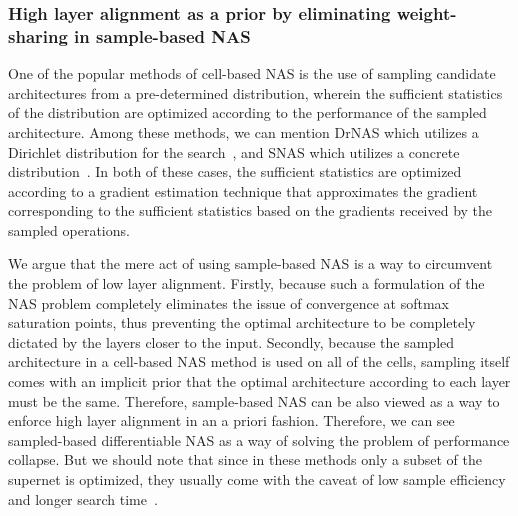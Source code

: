 \documentclass{article} \usepackage{fancyhdr, iclr2023_conference, times}
\newcommand{\lambdafn}{layer alignment\xspace}
\begin{document}
\subsubsection{High \lambdafn as a prior by eliminating weight-sharing in sample-based NAS}
\par One of the popular methods of cell-based NAS is the use of sampling candidate architectures from a pre-determined distribution, wherein the sufficient statistics of the distribution are optimized according to the performance of the sampled architecture. Among these methods, we can mention DrNAS which utilizes a Dirichlet distribution for the search~\citep{DBLP:conf/iclr/ChenWCTH21}, and SNAS which utilizes a concrete distribution~\citep{DBLP:conf/iclr/XieZLL19}. In both of these cases, the sufficient statistics are optimized according to a gradient estimation technique that approximates the gradient corresponding to the sufficient statistics based on the gradients received by the sampled operations.
\par We argue that the mere act of using sample-based NAS is a way to circumvent the problem of low \lambdafn. Firstly, because such a formulation of the NAS problem completely eliminates the issue of convergence at softmax saturation points, thus preventing the optimal architecture to be completely dictated by the layers closer to the input. Secondly, because the sampled architecture in a cell-based NAS method is used on all of the cells, sampling itself comes with an implicit prior that the optimal architecture according to each layer must be the same. Therefore, sample-based NAS can be also viewed as a way to enforce high \lambdafn in an a priori fashion. Therefore, we can see sampled-based differentiable NAS as a way of solving the problem of performance collapse. But we should note that since in these methods only a subset of the supernet is optimized, they usually come with the caveat of low sample efficiency and longer search time~\citep{DBLP:journals/csur/RenXCHLCW21}.
\end{document}
